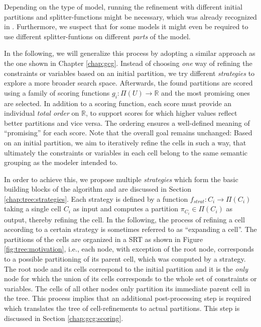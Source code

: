 		Depending on the type of model, running the refinement with different initial partitions and splitter-functions might be necessary, which was already recognized in \cite{salvagninDetectingSemanticGroups2016}.
		Furthermore, we suspect that for some models it might even be required to use different splitter-funtions on different \textit{parts} of the model.

		In the following, we will generalize this process by adopting a similar approach as the one shown in Chapter \ref{chap:gcg}.
		Instead of choosing \textit{one} way of refining the constraints or variables based on an initial partition, we try different \textit{strategies} to explore a more broader search space.
		Afterwards, the found partitions are scored using a family of scoring functions $g_i: \Pi(U) \rightarrow \mathbb{R}$ and the most promising ones are selected.
		In addition to a scoring function, each score must provide an individual \textit{total order} on $\mathbb{R}$, to support scores for which higher values reflect better partitions and vice versa. The ordering ensures a well-defined meaning of \enquote{promising} for each score.
		Note that the overall goal remains unchanged: Based on an initial partition, we aim to iteratively refine the cells in such a way, that ultimately the constraints or variables in each cell belong to the same semantic grouping as the modeler intended to.

		In order to achieve this, we propose multiple \textit{strategies} which form the basic building blocks of the algorithm and are discussed in Section \ref{chap:tree:strategies}.
		Each strategy is defined by a function $f_{strat}: C_i \rightarrow \Pi(C_i)$ taking a single cell $C_i$ as input and computes a partition $\pi_{C_i} \in \Pi(C_i)$ as output, thereby refining the cell.
		In the following, the process of refining a cell according to a certain strategy is sometimes referred to as \enquote{expanding a cell}.
		The partitions of the cells are organized in a \acf{SRT} as shown in Figure \ref{fig:tree:motivation}, i.e., each node, with exception of the root node, corresponds to a possible partitioning of its parent cell, which was computed by a strategy.
		The root node and its cells correspond to the initial partition and it is the \textit{only} node for which the union of its cells corresponds to the whole set of constraints or variables. The cells of all other nodes only partition its immediate parent cell in the tree.
		This process implies that an additional post-processing step is required which translates the tree of cell-refinements to actual partitions. This step is discussed in Section \ref{chap:gcg:scoring}.

